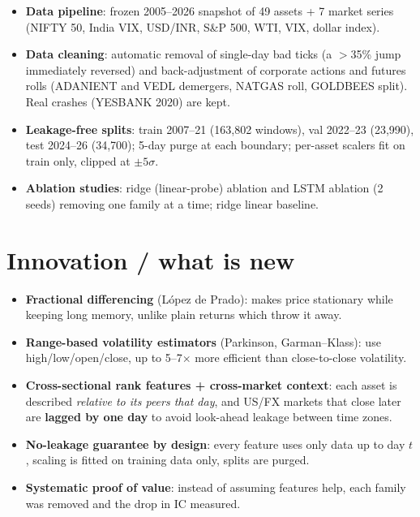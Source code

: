 \documentclass[10pt,a4paper]{article}
\begin{document}
\begin{itemize}
\begin{itemize}
    \item \emph{Calendar}: cyclical (sin/cos) day-of-week and month, day of month.
  \end{itemize}
  \item \textbf{Data pipeline}: frozen 2005--2026 snapshot of 49 assets + 7 market series (NIFTY 50, India VIX, USD/INR, S\&P 500, WTI, VIX, dollar index).
  \item \textbf{Data cleaning}: automatic removal of single-day bad ticks (a $>$35\% jump immediately reversed) and back-adjustment of corporate actions and futures rolls (ADANIENT and VEDL demergers, NATGAS roll, GOLDBEES split). Real crashes (YESBANK 2020) are kept.
  \item \textbf{Leakage-free splits}: train 2007--21 (163,802 windows), val 2022--23 (23,990), test 2024--26 (34,700); 5-day purge at each boundary; per-asset scalers fit on train only, clipped at $\pm5\sigma$.
  \item \textbf{Ablation studies}: ridge (linear-probe) ablation and LSTM ablation (2 seeds) removing one family at a time; ridge linear baseline.
\end{itemize}

\section{Innovation / what is new}
\begin{itemize}
  \item \textbf{Fractional differencing} (L\'opez de Prado): makes price stationary while keeping long memory, unlike plain returns which throw it away.
  \item \textbf{Range-based volatility estimators} (Parkinson, Garman--Klass): use high/low/open/close, up to 5--7$\times$ more efficient than close-to-close volatility.
  \item \textbf{Cross-sectional rank features + cross-market context}: each asset is described \emph{relative to its peers that day}, and US/FX markets that close later are \textbf{lagged by one day} to avoid look-ahead leakage between time zones.
  \item \textbf{No-leakage guarantee by design}: every feature uses only data up to day $t$, scaling is fitted on training data only, splits are purged.
  \item \textbf{Systematic proof of value}: instead of assuming features help, each family was removed and the drop in IC measured.
\end{itemize}
\end{document}
